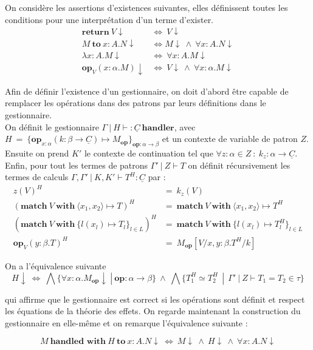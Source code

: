 On considère les assertions d'existences suivantes, elles définissent toutes les conditions pour une interprétation d'un terme d'exister.
\begin{align*}
	\textbf{return}~V \downarrow &\Leftrightarrow~V \downarrow\\
	M~\textbf{to}~x:A.N \downarrow&\Leftrightarrow M\downarrow~\wedge~\forall x:A.N\downarrow\\
	\lambda x:A.M\downarrow&\Leftrightarrow~\forall x:A.M\downarrow\\
	\textbf{op}_V(x:\alpha.M)\downarrow&\Leftrightarrow~V\downarrow~\wedge~\forall x:\alpha.M\downarrow
\end{align*}

Afin de définir l'existence d'un gestionnaire, on doit d'abord être capable de remplacer les opérations dans des patrons par leurs définitions dans le gestionnaire.\\
On définit le gestionnaire $\Gamma~|~H \vdash : \underline{C}~\textbf{handler}$, avec $H~=~\{\textbf{op}_{x:\alpha}(k:\beta \rightarrow \underline{C}) \mapsto M_\textbf{op}\}_{\textbf{op}:\alpha \rightarrow \beta}$ et un contexte de variable de patron $Z$. Ensuite on prend $K'$ le contexte de continuation tel que  $\forall z:\alpha \in Z~:~k_z : \alpha \rightarrow \underline{C}$. Enfin, pour tout les termes de patrons $\Gamma'~|~Z \vdash T$ on définit récursivement les termes de calculs $\Gamma,\Gamma'~|~K,K' \vdash T^H : \underline{C}$ par :
\begin{align*}
	z(V)^H &=~ k_z(V)\\
	(\textbf{match}~V~\textbf{with}~\langle x_1,x_2\rangle \mapsto T)^H &=~\textbf{match}~V~\textbf{with}~\langle x_1,x_2\rangle \mapsto T^H\\
	(\textbf{match}~V~\textbf{with}~\{ l(x_l) \mapsto T_l\}_{l \in L})^H &=~\textbf{match}~V~\textbf{with}~\{ l(x_l) \mapsto T_l^H\}_{l \in L}\\
	\textbf{op}_V(y:\beta.T)^H &=~M_\textbf{op}[V/x,y:\beta.T^H/k]
\end{align*}

On a l'équivalence suivante
	\[H\downarrow~\Leftrightarrow~\bigwedge\{\forall x:\alpha.M_\textbf{op}\downarrow~|~\textbf{op}: \alpha \rightarrow \beta\}~\land~\bigwedge\{T_1^H \simeq T_2^H~~|~~\Gamma'~|~Z \vdash T_1 = T_2 \in \tau\}\]

qui affirme que le gestionnaire est correct si les opérations sont définit et respect les équations de la théorie des effets. On regarde maintenant la construction du gestionnaire en elle-même et on remarque l'équivalence suivante :

	\[M~\textbf{handled~with}~H~\textbf{to}~x:A.N\downarrow~\Leftrightarrow~ M\downarrow~\land~H\downarrow~\land~\forall x:A.N\downarrow\]
 

